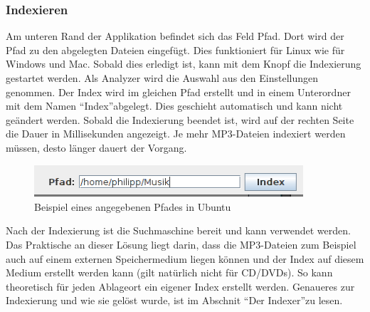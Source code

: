 \documentclass[12pt,a4paper,ngerman]{report}
\begin{document}
\subsubsection{Indexieren}
Am unteren Rand der Applikation befindet sich das Feld Pfad. Dort wird der Pfad zu den abgelegten Dateien eingefügt. Dies funktioniert für Linux wie für Windows und Mac. Sobald dies erledigt ist, kann mit dem Knopf die Indexierung gestartet werden. Als Analyzer wird die Auswahl aus den Einstellungen genommen. Der Index wird im gleichen Pfad erstellt und in einem Unterordner mit dem Namen \textquotedblleft Index\textquotedblright abgelegt. Dies geschieht automatisch und kann nicht geändert werden. Sobald die Indexierung beendet ist, wird auf der rechten Seite die Dauer in Millisekunden angezeigt. Je mehr MP3-Dateien indexiert werden müssen, desto länger dauert der Vorgang.
\begin{figure}[h!]
\centering
\includegraphics[width=10cm]{img/Pfadangabe.png}
\caption{Beispiel eines angegebenen Pfades in Ubuntu\protect\footnotemark}
\end{figure}
Nach der Indexierung ist die Suchmaschine bereit und kann verwendet werden. Das Praktische an dieser Lösung liegt darin, dass die MP3-Dateien zum Beispiel auch auf einem externen Speichermedium liegen können und der Index auf diesem Medium erstellt werden kann (gilt natürlich nicht für CD/DVDs). So kann theoretisch für jeden Ablageort ein eigener Index erstellt werden. Genaueres zur Indexierung und wie sie gelöst wurde, ist im Abschnit \textquotedblleft Der Indexer\textquotedblright zu lesen.
\end{document}

